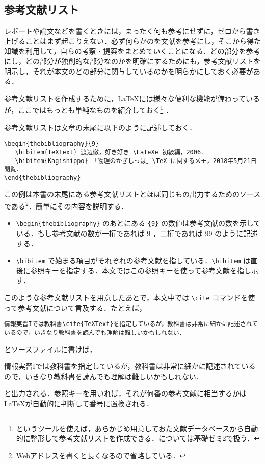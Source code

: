 \subsection{参考文献リスト}

レポートや論文などを書くときには，まったく何も参考にせずに，ゼロから書き上げることはまず起こりえない．必ず何らかのを文献を参考にし，そこから得た知識を利用して，自らの考察・提案をまとめていくことになる．どの部分を参考にし，どの部分が独創的な部分なのかを明確にするためにも，参考文献リストを明示し，それが本文のどの部分に関与しているのかを明らかにしておく必要がある．

参考文献リストを作成するために，\LaTeX には様々な便利な機能が備わっているが，ここではもっとも単純なものを紹介しておく\footnote{\BibTeX というツールを使えば，あらかじめ用意しておた文献データベースから自動的に整形して参考文献リストを作成できる．\BibTeX については基礎ゼミ2で扱う．} ．

参考文献リストは文章の末尾に以下のように記述しておく．
\begin{screen}
\begin{verbatim}
\begin{thebibliography}{9}
   \bibitem{TeXText} 渡辺徹，好き好き \LaTeXe 初級編，2006．
   \bibitem{Kagishippo} 「物理のかぎしっぽ」\TeX に関するメモ，2018年5月21日閲覧．
\end{thebibliography}
\end{verbatim}
\end{screen}
この例は本書の末尾にある参考文献リストとほぼ同じもの出力するためのソースである\footnote{Webアドレスを書くと長くなるので省略している．}．簡単にその内容を説明する．
\begin{itemize}
\item \verb|\begin{thebibliography}| のあとにある \verb|{9}| の数値は参考文献の数を示している．もし参考文献の数が一桁であれば 9 ，二桁であれば 99 のように記述する．
\item \verb|\bibitem| で始まる項目がそれぞれの参考文献を指している．\verb|\bibitem| は直後に参照キーを指定する．本文ではこの参照キーを使って参考文献を指し示す．
\end{itemize}
このような参考文献リストを用意したあとで，本文中では \verb|\cite| コマンドを使って参考文献について言及する．たとえば，
\begin{screen}
\begin{verbatim}
情報実習Iでは教科書\cite{TeXText}を指定しているが，教科書は非常に細かに記述されているので，いきなり教科書を読んでも理解は難しいかもしれない．
\end{verbatim}
\end{screen}
とソースファイルに書けば，
\begin{screen}
情報実習Iでは教科書\cite{TeXText}を指定しているが，教科書は非常に細かに記述されているので，いきなり教科書を読んでも理解は難しいかもしれない．
\end{screen}
と出力される．参照キーを用いれば，それが何番の参考文献に相当するかは \LaTeX が自動的に判断して番号に置換される．
